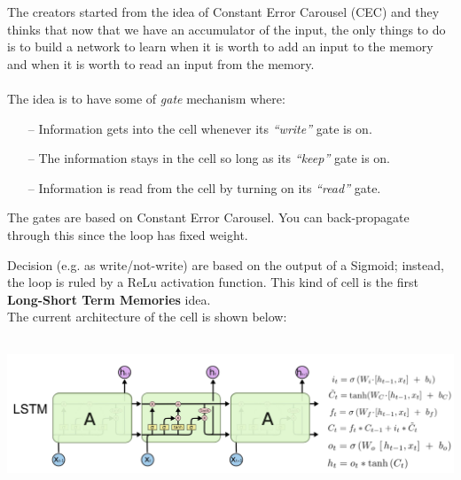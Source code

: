 The creators started from the idea of Constant Error Carousel (CEC) and they thinks that now that we have an accumulator of the input, the only things to do is to build a network to learn when it is worth to add an input to the memory and when it is worth to read an input from the memory. \\ \\
The idea is to have some of \textit{gate} mechanism where:
\begin{itemize}
    \item[--] Information gets into the cell whenever its \textit{“write”} gate is on.
    \item[--] The information stays in the cell so long as its \textit{“keep”} gate is on.
    \item[--] Information is read from the cell by turning on its \textit{“read”} gate.
\end{itemize}{}
The gates are based on Constant Error Carousel. You can back-propagate through this since the loop has fixed weight. 

Decision (e.g. as write/not-write) are based on the output of a Sigmoid; instead, the loop is ruled by a ReLu activation function. This kind of cell is the first \textbf{Long-Short Term Memories} idea. \\
The current architecture of the cell is shown below:

\vspace{0.2cm}
\begin{minipage}{\linewidth}
    \centering
    \includegraphics[width=15cm, height=4.5cm]{images/lstm.png}
    \label{fig:lstm}
\end{minipage}
\vspace{0.2cm}

